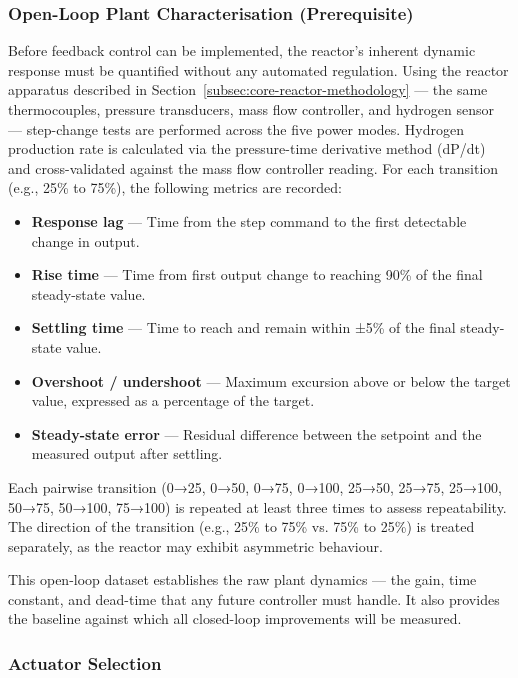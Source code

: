 \documentclass[12pt]{article}
\begin{document}
\subsubsection*{Open-Loop Plant Characterisation (Prerequisite)}

Before feedback control can be implemented, the reactor's inherent dynamic response 
must be quantified without any automated regulation. Using the reactor apparatus 
described in Section~\ref{subsec:core-reactor-methodology} --- the same 
thermocouples, pressure transducers, mass flow controller, and hydrogen sensor --- 
step-change tests are performed across the five power modes. Hydrogen production 
rate is calculated via the pressure-time derivative method (dP/dt) and 
cross-validated against the mass flow controller reading. For each transition 
(e.g., 25\% to 75\%), the following metrics are recorded:

\begin{itemize}
    \item \textbf{Response lag} --- Time from the step command to the first 
    detectable change in output.
    \item \textbf{Rise time} --- Time from first output change to reaching 90\% of 
    the final steady-state value.
    \item \textbf{Settling time} --- Time to reach and remain within ±5\% of the 
    final steady-state value.
    \item \textbf{Overshoot / undershoot} --- Maximum excursion above or below the 
    target value, expressed as a percentage of the target.
    \item \textbf{Steady-state error} --- Residual difference between the setpoint 
    and the measured output after settling.
\end{itemize}

Each pairwise transition (0→25, 0→50, 0→75, 0→100, 25→50, 25→75, 25→100, 50→75, 
50→100, 75→100) is repeated at least three times to assess repeatability. The 
direction of the transition (e.g., 25\% to 75\% vs. 75\% to 25\%) is treated 
separately, as the reactor may exhibit asymmetric behaviour.

This open-loop dataset establishes the raw plant dynamics --- the gain, time 
constant, and dead-time that any future controller must handle. It also provides 
the baseline against which all closed-loop improvements will be measured.

\subsubsection*{Actuator Selection}
\end{document}
